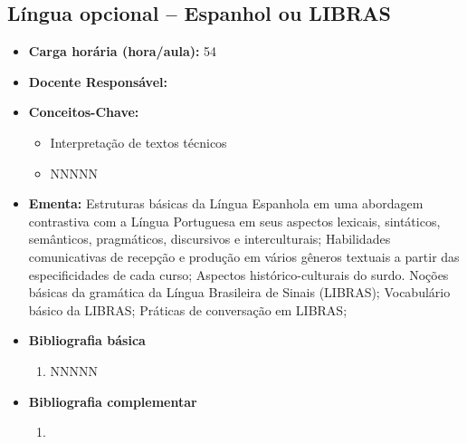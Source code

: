 \documentclass[11pt,fleqn]{book} %
\begin{document}
\subsection{Língua opcional – Espanhol ou LIBRAS}\label{disc:espanhol_libras}
\begin{itemize}
	\item \textbf{Carga horária (hora/aula):} 54
	\item \textbf{Docente Responsável:}
	\item \textbf{Conceitos-Chave:}
	\begin{itemize}
		\item Interpretação de textos técnicos
		\item NNNNN
	\end{itemize}
	\item \textbf{Ementa:} 
	Estruturas básicas da Língua Espanhola em uma abordagem contrastiva com a Língua Portuguesa em seus aspectos lexicais, sintáticos, semânticos, pragmáticos, discursivos e interculturais; 
	Habilidades comunicativas de recepção e produção em vários gêneros textuais a partir das especificidades de cada curso;
	Aspectos histórico-culturais do surdo. Noções básicas da gramática da Língua Brasileira de Sinais (LIBRAS);
	Vocabulário básico da LIBRAS;
	Práticas de conversação em LIBRAS;		
	\item \textbf{Bibliografia básica}
	\begin{enumerate}
		\item NNNNN
	\end{enumerate}
	\item \textbf{Bibliografia complementar}
	\begin{enumerate}
		\item 
	\end{enumerate}	
\end{itemize}

\newpage
\end{document}
